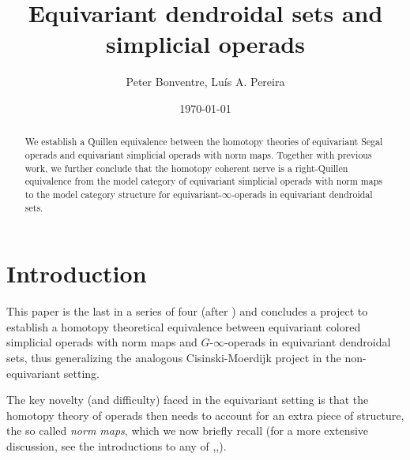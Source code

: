 \documentclass[a4paper,10pt]{article}%
\title{Equivariant dendroidal sets and simplicial operads}
\author{Peter Bonventre, Lu\'is A. Pereira}%
\date{\today}
\numberwithin{equation}{section}
\numberwithin{figure}{section}
\theoremstyle{definition} %
\newcommand{\1}{\ensuremath{\mathbbm 1}}%
\begin{document}
\maketitle

\begin{abstract}
	We establish a Quillen equivalence between the homotopy theories of 
	equivariant Segal operads and equivariant simplicial operads with norm maps.
	Together with previous work, 
	we further conclude that the homotopy coherent nerve
	is a right-Quillen equivalence from the 
	model category of
	equivariant simplicial operads with norm maps
	to the
	model category structure
	for equivariant-$\infty$-operads in equivariant dendroidal sets.
\end{abstract}

\tableofcontents


\section{Introduction}

This paper is the last in a series of four
(after \cite{Per18,BP_edss,BP_HGOP})
and concludes a project to establish a homotopy theoretical equivalence
between equivariant colored simplicial operads with norm maps
and $G$-$\infty$-operads in equivariant dendroidal sets,
thus generalizing the analogous 
Cisinski-Moerdijk project 
\cite{CM13a,CM13b,CM11}
in the non-equivariant setting.

The key novelty (and difficulty) faced in the equivariant setting is that the homotopy theory of operads
then needs to account for an 
extra piece of structure,
the so called \emph{norm maps},
which we now briefly recall
(for a more extensive discussion, 
see the introductions to any of
\cite{Per18},\cite{BP_geo},\cite{BP_HGOP}).
\end{document}
